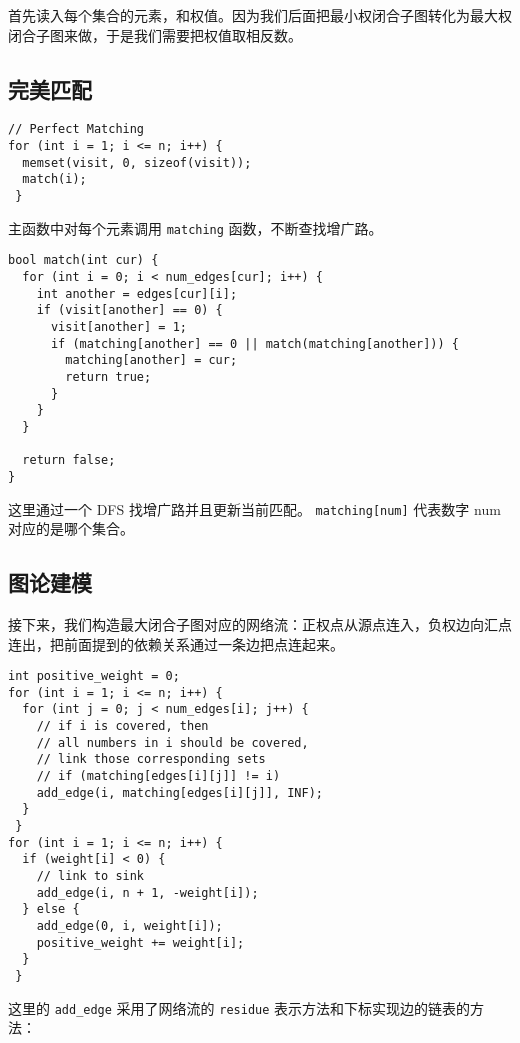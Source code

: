 \documentclass[11pt]{article}
\begin{document}
首先读入每个集合的元素，和权值。因为我们后面把最小权闭合子图转化为最大权闭合子图来做，于是我们需要把权值取相反数。

\subsection{完美匹配}
\label{sec:orga3217d5}

\begin{verbatim}
// Perfect Matching
for (int i = 1; i <= n; i++) {
  memset(visit, 0, sizeof(visit));
  match(i);
 }
\end{verbatim}

主函数中对每个元素调用 \texttt{matching} 函数，不断查找增广路。

\begin{verbatim}
bool match(int cur) {
  for (int i = 0; i < num_edges[cur]; i++) {
    int another = edges[cur][i];
    if (visit[another] == 0) {
      visit[another] = 1;
      if (matching[another] == 0 || match(matching[another])) {
        matching[another] = cur;
        return true;
      }
    }
  }

  return false;
}
\end{verbatim}

这里通过一个 DFS 找增广路并且更新当前匹配。 \texttt{matching[num]} 代表数字 num 对应的是哪个集合。

\subsection{图论建模}
\label{sec:orge134f94}
接下来，我们构造最大闭合子图对应的网络流：正权点从源点连入，负权边向汇点连出，把前面提到的依赖关系通过一条边把点连起来。

\begin{verbatim}
int positive_weight = 0;
for (int i = 1; i <= n; i++) {
  for (int j = 0; j < num_edges[i]; j++) {
    // if i is covered, then
    // all numbers in i should be covered,
    // link those corresponding sets
    // if (matching[edges[i][j]] != i)
    add_edge(i, matching[edges[i][j]], INF);
  }
 }
for (int i = 1; i <= n; i++) {
  if (weight[i] < 0) {
    // link to sink
    add_edge(i, n + 1, -weight[i]);
  } else {
    add_edge(0, i, weight[i]);
    positive_weight += weight[i];
  }
 }
\end{verbatim}

这里的 \texttt{add\_edge} 采用了网络流的 \texttt{residue} 表示方法和下标实现边的链表的方法：
\end{document}
